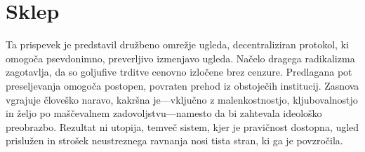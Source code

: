 \documentclass[11pt,a4paper,twocolumn]{article}
\begin{document}
\section{Sklep}

Ta prispevek je predstavil družbeno omrežje ugleda, decentraliziran protokol, ki omogoča psevdonimno, preverljivo izmenjavo ugleda. Načelo dragega radikalizma zagotavlja, da so goljufive trditve cenovno izločene brez cenzure. Predlagana pot preseljevanja omogoča postopen, povraten prehod iz obstoječih institucij. Zasnova vgrajuje človeško naravo, kakršna je---vključno z malenkostnostjo, kljubovalnostjo in željo po maščevalnem zadovoljstvu---namesto da bi zahtevala ideološko preobrazbo. Rezultat ni utopija, temveč sistem, kjer je pravičnost dostopna, ugled prislužen in strošek neustreznega ravnanja nosi tista stran, ki ga je povzročila.


\end{document}
